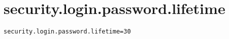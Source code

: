 \section{security.login.password.lifetime}
\label{configuration:SecurityLoginPasswordLifetime}
\AvailableInJavaOnly{\TODO}
\begin{lstlisting}[style=Props,caption={Usage example for \textit{security.login.password.lifetime}}]
security.login.password.lifetime=30
\end{lstlisting}